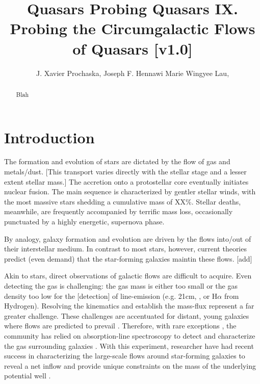 \documentclass[12pt,preprint]{aastex}
\begin{document}
\title{Quasars Probing Quasars IX. 
  Probing the Circumgalactic Flows of Quasars [v1.0]
}

\author{
J. Xavier Prochaska,
Joseph F. Hennawi
Marie Wingyee Lau,
}

\begin{abstract}
Blah
\end{abstract}



\section{Introduction}



The formation and evolution of stars are dictated
by the flow of gas and metals/dust.  [This transport
varies directly with the stellar stage
and a lesser extent stellar mass.]
The accretion onto a protostellar  core eventually
initiates nuclear fusion.  The main sequence is characterized
by gentler stellar winds, with the most massive
stars shedding a cumulative mass of XX\%.
Stellar deaths, meanwhile, are frequently accompanied by terrific
mass loss, occasionally punctuated by a highly energetic,
supernova phase.

By analogy, galaxy formation and evolution are driven by the
flows into/out of their interstellar medium.
In contrast to most stars, however, current theories
predict (even demand) that the star-forming galaxies
maintin these flows. [add]

Akin to stars, direct observations of galactic flows are
difficult to acquire.  Even detecting the gas is challenging:
the gas mass is either too small or the gas density too low
for the [detection] of line-emission (e.g. 21cm, \lya,
or H$\alpha$ from Hydrogen).  Resolving the kinematics
and establish the mass-flux represent a far greater challenge.
These challenges are accentuated for distant, young galaxies
where flows are predicted to prevail \citep{keres,fumagalli}.
Therefore, with rare exceptions \citep[e.g.][]{slug,jackpot},
the community has relied on absorption-line spectroscopy
to detect and characterize the gas surrounding galaxies
\citep[e.g.][]{bergeron,steidel10,pro11,tumlinson13}.
With this experiment, researcher have had recent success
in characterizing the large-scale flows around star-forming
galaxies to reveal a net inflow \cite{rakic13} and
provide unique constraints on the mass of the underlying
potential well \cite{rakic14}.
\end{document}

